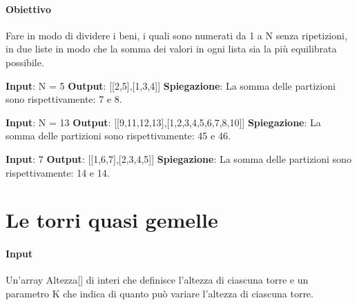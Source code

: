     \paragraph{Obiettivo} Fare in modo di dividere i beni, i quali sono numerati da 1 a N senza ripetizioni, in due liste in modo che la somma dei valori in ogni lista sia la più equilibrata possibile.
    \begin{esempio}
        \newline
        \textbf{Input}: N = 5
        \newline
        \textbf{Output}: [[2,5],[1,3,4]]
        \newline
        \textbf{Spiegazione}: La somma delle partizioni sono rispettivamente: 7 e 8.
    \end{esempio}
    \begin{esempio}
        \newline
        \textbf{Input}: N = 13
        \newline
        \textbf{Output}: [[9,11,12,13],[1,2,3,4,5,6,7,8,10]]
        \newline
        \textbf{Spiegazione}: La somma delle partizioni sono rispettivamente: 45 e 46.
    \end{esempio}
    \begin{esempio}
        \newline
        \textbf{Input}: 7
        \newline
        \textbf{Output}: [[1,6,7],[2,3,4,5]]
        \newline
        \textbf{Spiegazione}: La somma delle partizioni sono rispettivamente: 14 e 14.
    \end{esempio}

\newpage
\thispagestyle{chapterInit}
\section*{Le torri quasi gemelle}
    \paragraph{Input} Un'array Altezza[] di interi che definisce l'altezza di ciascuna torre e un parametro K che indica di quanto può variare l'altezza di ciascuna torre.
